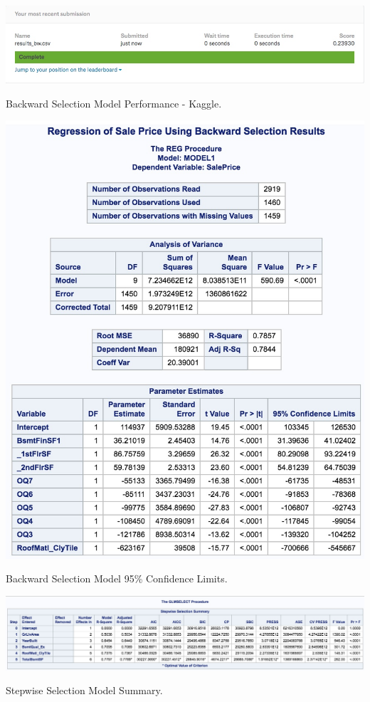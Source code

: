 \documentclass[11pt]{scrartcl} %
\begin{document}
\hrulefill
\begin{table}[H] %
	\centering %
	\includegraphics[scale=.4]{../graphics/A2BWKaggle}
	\caption{Backward Selection Model Performance - Kaggle.}
	\label{tab:A2BWKaggle}
\end{table}
\hrulefill
\begin{table}[H] %
	\centering %
	\includegraphics[scale=.3]{../graphics/A2BWCI}
	\caption{Backward Selection Model 95\% Confidence Limits.}
	\label{tab:A2BWCI}
\end{table}
\hrulefill
\begin{table}[H] %
	\centering %
	\includegraphics[scale=.25]{../graphics/A2SWfeatures}
	\caption{Stepwise Selection Model Summary.}
	\label{tab:A2SWsummary}
\end{table}
\end{document}
